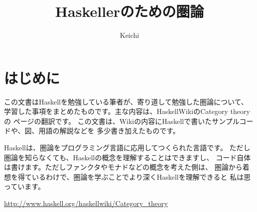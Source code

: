 \documentclass{jsarticle}
\begin{document}
\title{Haskellerのための圏論}
\author{Keichi}
\maketitle

\section{はじめに}
この文書はHaskellを勉強している筆者が、寄り道して勉強した圏論について、
学習した事項をまとめたものです。主な内容は、HaskellWikiのCategory theoryの
ページ\cite{wiki}の翻訳です。
この文書は、Wikiの内容にHaskellで書いたサンプルコードや、図、用語の解説などを
多少書き加えたものです。

Haskellは、圏論をプログラミング言語に応用してつくられた言語です。
ただし圏論を知らなくても、Haskellの概念を理解することはできますし、
コード自体は書けます。ただしファンクタやモナドなどの概念を考えた側は、
圏論から着想を得ているわけで、圏論を学ぶことでより深くHaskellを理解できると
私は思っています。









\begin{thebibliography}{99}

\url{http://www.haskell.org/haskellwiki/Category_theory}

\end{thebibliography}
\end{document}
